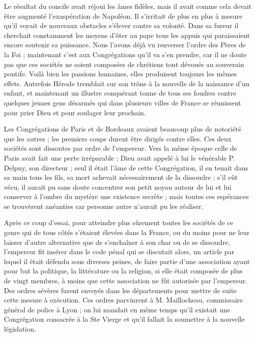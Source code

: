 Le résultat du concile avait réjoui les âmes fidèles, mais il
avait comme cela devait être augmenté l'exaspération de Napoléon. Il s'irritait de plus en plus à mesure qu'il voyait de nouveaux obstacles s'élever contre sa volonté. Dans sa fureur il cherchait constamment les moyens d'ôter au pape tous les appuis qui paraissaient encore soutenir sa puissance. Nous l'avons déjà vu renverser l'ordre des Pères de la Foi ; maintenant c'est aux Congrégations qu'il va s'en prendre, car il ne doute pas que ces sociétés ne soient composées de chrétiens tout dévoués au souverain pontife. Voilà bien les passions humaines, elles produisent toujours les mêmes effets. Autrefois Hérode tremblait sur son trône à la nouvelle de la naissance d'un enfant, et maintenant un illustre conquérant tonne de tous ses foudres contre quelques jeunes gens désarmés qui dans plusieurs villes de France se réunissent pour prier Dieu et pour soulager leur prochain.

Les Congrégations de Paris et de Bordeaux avaient beaucoup plus de notoriété que les autres ; les premiers coups durent être dirigés contre elles. Ces deux sociétés sont dissoutes par ordre de l'empereur. Vers la même époque celle de Paris avait fait une perte irréparable ; Dieu avait appelé à lui le vénérable P. Delpuy, son directeur ; seul il était l'âme de cette Congrégation, il en tenait dans sa main tous les fils, sa mort achevait nécessairement de la dissoudre ; s'il eût vécu, il aurait pu sans doute concentrer son petit noyau autour de lui et lui conserver à l'ombre du mystère une existence secrète ; mais toutes ces espérances se trouvèrent anéanties car personne autre n'aurait pu les réaliser.

Après ce coup d'essai, pour atteindre plus sûrement toutes
les sociétés de ce genre qui de tous côtés s'étaient élevées dans la France, ou du moins pour ne leur laisser d'autre alternative que de s'enchaîner à son char ou de se dissoudre, l'empereur fit insérer dans le code pénal qui se discutait alors, un article par lequel il était défendu sous diverses peines, de faire partie d'une association ayant pour but la politique, la littérature ou la religion, si elle était composée de plus de vingt membres, à moins que cette association ne fût autorisée par l'empereur. Des ordres sévères furent envoyés dans les départements pour mettre de suite cette mesure à exécution. Ces ordres parvinrent à M. Maillocheau, commissaire général de police à Lyon ; on lui mandait en même temps qu'il existait une Congrégation consacrée à la Ste Vierge et qu'il fallait la soumettre à la nouvelle législation.


